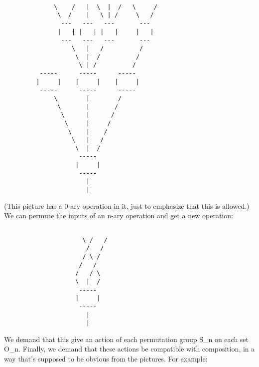 \begin{verbatim}

              \    /   |  \  |  /   \     / 
               \  /    |   \ | /     \   / 
                ---   ---   ---       ---
               |   | |   | |   |     |   |
                ---   ---   ---       ---
                   \   |   /          /
                    \  |  /          / 
                     \ | /          / 
          -----      -----      -----
         |     |    |     |    |     |
          -----      -----      -----
              \        |        /  
               \       |       /   
                \      |      /
                 \     |     / 
                  \    |    / 
                   \   |   /   
                    \  |  /
                     -----
                    |     | 
                     -----
                       |
                       |
\end{verbatim}
    
(This picture has a 0-ary operation in it, just to emphasize
that this is allowed.)  We can permute the inputs of an n-ary 
operation and get a new operation:
                      

\begin{verbatim}

                      \ /   /
                       /   /
                      / \ /    
                     /   /   
                    /   / \
                    \  |  /
                     -----
                    |     | 
                     -----
                       |
                       |
\end{verbatim}
    
We demand that this give an action of each permutation group S_{n} 
on each set O_{n}.  Finally, we demand that these actions
be compatible with composition, in a way that's supposed to be
obvious from the pictures.   For example:



